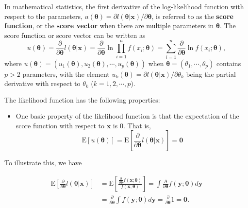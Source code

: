 \documentclass[]{book}
\providecommand{\tightlist}{%
  \setlength{\itemsep}{0pt}\setlength{\parskip}{0pt}}
\theoremstyle{definition}
\theoremstyle{definition}
\theoremstyle{definition}
\theoremstyle{remark}
\begin{document}
In mathematical statistics, the first derivative of the log-likelihood
function with respect to the parameters,
\(u(\boldsymbol\theta)=\partial l(\boldsymbol \theta|\mathbf{x})/\partial \boldsymbol \theta\),
is referred to as the \textbf{score function}, or the \textbf{score
vector} when there are multiple parameters in \(\boldsymbol\theta\). The
score function or score vector can be written as
\[u(\boldsymbol\theta)=\frac{ \partial}{\partial \boldsymbol \theta} l(\boldsymbol \theta|\mathbf{x})
    =\frac{ \partial}{\partial \boldsymbol \theta} \ln \prod_{i=1}^n
    f(x_i;\boldsymbol \theta ) =\sum_{i=1}^n \frac{
    \partial}{\partial \boldsymbol \theta}
    \ln f(x_i;\boldsymbol \theta ),\] where
\(u(\boldsymbol\theta)=(u_1(\boldsymbol\theta),u_2(\boldsymbol\theta),\cdots,u_p(\boldsymbol\theta))\)
when \(\boldsymbol\theta=(\theta_1,\cdots,\theta_p)\) contains \(p>2\)
parameters, with the element
\(u_k(\boldsymbol\theta)=\partial l(\boldsymbol \theta|\mathbf{x})/\partial \theta_k\)
being the partial derivative with respect to \(\theta_k\)
(\(k=1,2,\cdots,p\)).

The likelihood function has the following properties:

\begin{itemize}
\tightlist
\item
  One basic property of the likelihood function is that the expectation
  of the score function with respect to \(\mathbf{x}\) is 0. That is,
  \[\mathrm{E}[u(\boldsymbol\theta)]=\mathrm{E} \left[ \frac{ \partial}{\partial \boldsymbol \theta}
  l(\boldsymbol \theta|\mathbf{x}) \right] = \mathbf 0\]
\end{itemize}

To illustrate this, we have

\[\begin{aligned}
    \mathrm{E} \left[ \frac{ \partial}{\partial \boldsymbol \theta} l(\boldsymbol \theta|\mathbf{x}) \right]
    &= \mathrm{E} \left[ \frac{\frac{\partial}{\partial \boldsymbol \theta}f(\mathbf{x};\boldsymbol \theta)}{f(\mathbf{x};\boldsymbol \theta )}  \right]
    = \int\frac{\partial}{\partial \boldsymbol \theta} f(\mathbf{y};\boldsymbol \theta ) d \mathbf y \\
    &= \frac{\partial}{\partial \boldsymbol \theta} \int f(\mathbf{y};\boldsymbol \theta ) d \mathbf y
    = \frac{\partial}{\partial \boldsymbol \theta} 1 = \mathbf 0.\end{aligned}\]
\end{document}
